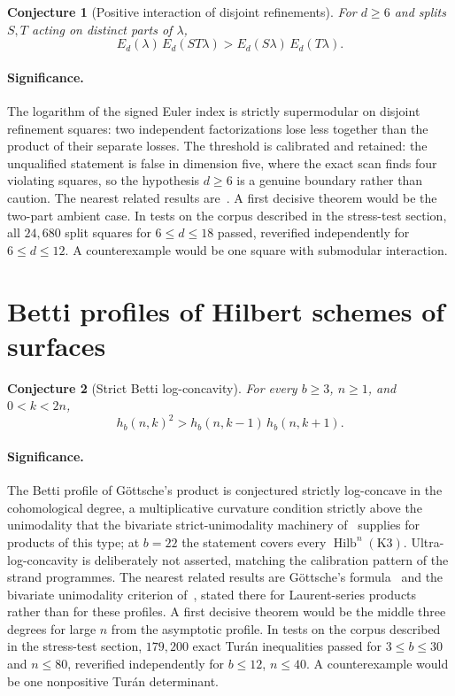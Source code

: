 \documentclass[11pt]{article}
\newtheorem{conjecture}{Conjecture}
\theoremstyle{definition}
\begin{document}
\begin{conjecture}[Positive interaction of disjoint refinements]\label{y4}
For $d\ge6$ and splits $S,T$ acting on distinct parts of $\lambda$,
\[
E_d(\lambda)\,E_d(ST\lambda)>E_d(S\lambda)\,E_d(T\lambda).
\]
\end{conjecture}

\paragraph{Significance.}
The logarithm of the signed Euler index is strictly supermodular on disjoint refinement squares: two independent factorizations lose less together than the product of their separate losses.  The threshold is calibrated and retained: the unqualified statement is false in dimension five, where the exact scan finds four violating squares, so the hypothesis $d\ge6$ is a genuine boundary rather than caution.  The nearest related results are~\cite{He21,AndGCICY}.  A first decisive theorem would be the two-part ambient case.  In tests on the corpus described in the stress-test section, all $24{,}680$ split squares for $6\le d\le18$ passed, reverified independently for $6\le d\le12$.  A counterexample would be one square with submodular interaction.

\section{Betti profiles of Hilbert schemes of surfaces}

\begin{conjecture}[Strict Betti log-concavity]\label{y5}
For every $b\ge3$, $n\ge1$, and $0<k<2n$,
\[
h_b(n,k)^2>h_b(n,k-1)\,h_b(n,k+1).
\]
\end{conjecture}

\paragraph{Significance.}
The Betti profile of G\"ottsche's product is conjectured strictly log-concave in the cohomological degree, a multiplicative curvature condition strictly above the unimodality that the bivariate strict-unimodality machinery of~\cite{Zhou25} supplies for products of this type; at $b=22$ the statement covers every $\operatorname{Hilb}^n(\mathrm{K3})$.  Ultra-log-concavity is deliberately not asserted, matching the calibration pattern of the strand programmes.  The nearest related results are G\"ottsche's formula~\cite{Go90} and the bivariate unimodality criterion of~\cite{Zhou25}, stated there for Laurent-series products rather than for these profiles.  A first decisive theorem would be the middle three degrees for large $n$ from the asymptotic profile.  In tests on the corpus described in the stress-test section, $179{,}200$ exact Tur\'an inequalities passed for $3\le b\le30$ and $n\le80$, reverified independently for $b\le12$, $n\le40$.  A counterexample would be one nonpositive Tur\'an determinant.
\end{document}
